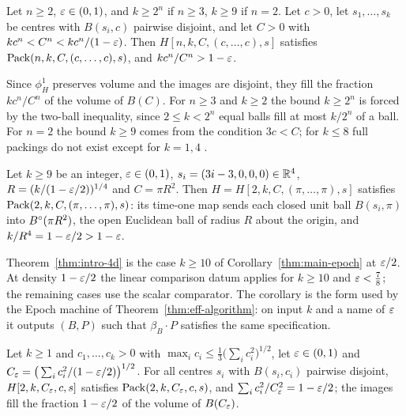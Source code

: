 \begin{maincorollary}\label{thm:main-equal}
Let $n\ge2$, $\varepsilon\in(0,1)$, and $k\ge2^n$ if $n\ge3$, $k\ge9$ if $n=2$. Let $c>0$, let $s_1,\dots,s_k$ be
centres with $B(s_i,c)$ pairwise disjoint, and let $C>0$ with $kc^n<C^n<kc^n/(1-\varepsilon)$. Then
$H[n,k,C,(c,\dots,c),s]$ satisfies $\mathrm{Pack}(n,k,C,(c,\dots,c),s)$, and $kc^n/C^n>1-\varepsilon$.
\end{maincorollary}

Since $\phi^1_H$ preserves volume and the images are disjoint, they fill the fraction $kc^n/C^n$ of the volume of
$B(C)$. For $n\ge3$ and $k\ge2$ the bound $k\ge2^n$ is forced by the two-ball inequality, since $2\le k<2^n$ equal
balls fill at most $k/2^n$ of a ball. For $n=2$ the bound $k\ge9$ comes from the condition $3c<C$; for $k\le8$ full packings
do not exist except for $k=1,4$ \cite{McDuffPolterovich1994}.

\begin{maincorollary}\label{thm:main-epoch}
Let $k\ge9$ be an integer, $\varepsilon\in(0,1)$, $s_i=(3i-3,0,0,0)\in\mathbb{R}^4$, $R=(k/(1-\varepsilon/2))^{1/4}$ and $C=\pi R^2$. Then
$H=H[2,k,C,(\pi,\dots,\pi),s]$ satisfies $\mathrm{Pack}(2,k,C,(\pi,\dots,\pi),s)$: its time-one map sends each closed unit ball
$B(s_i,\pi)$ into $B^{\circ}(\pi R^2)$, the open Euclidean ball of radius $R$ about the origin, and $k/R^4=1-\varepsilon/2>1-\varepsilon$.
\end{maincorollary}

Theorem~\ref{thm:intro-4d} is the case $k\ge10$ of Corollary~\ref{thm:main-epoch} at $\varepsilon/2$. At density
$1-\varepsilon/2$ the linear comparison datum applies for $k\ge10$ and $\varepsilon<\frac78$; the remaining cases use the scalar
comparator. The corollary is the form used by the Epoch machine of Theorem~\ref{thm:eff-algorithm}: on input $k$ and a name of $\varepsilon$ it outputs $(B,P)$
such that $\beta_B\cdot P$ satisfies the same specification.

\begin{maincorollary}\label{thm:main-cone4}
Let $k\ge1$ and $c_1,\dots,c_k>0$ with $\max_ic_i\le\frac13\big(\sum_ic_i^2\big)^{1/2}$, let $\varepsilon\in(0,1)$ and
$C_\varepsilon=\big(\sum_ic_i^2/(1-\varepsilon/2)\big)^{1/2}$. For all centres $s_i$ with $B(s_i,c_i)$ pairwise disjoint,
$H[2,k,C_\varepsilon,c,s]$ satisfies $\mathrm{Pack}(2,k,C_\varepsilon,c,s)$, and $\sum_ic_i^2/C_\varepsilon^2=1-\varepsilon/2$; the images fill the fraction
$1-\varepsilon/2$ of the volume of $B(C_\varepsilon)$.
\end{maincorollary}

